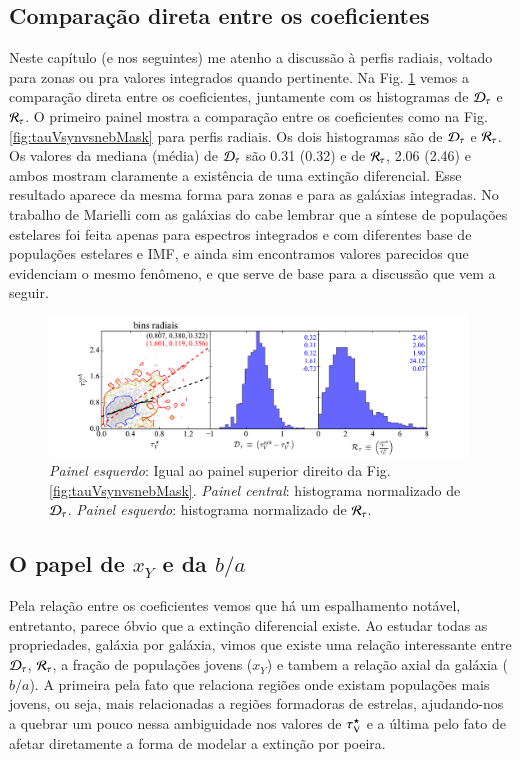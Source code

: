 \subsection{Comparação direta entre os coeficientes}
\label{sec:difextin:emp:comparetauV}

Neste capítulo (e nos seguintes) me atenho a discussão à perfis radiais, voltado para zonas ou pra
valores integrados quando pertinente. Na Fig. \ref{fig:tauVhisto} vemos a comparação direta entre os
coeficientes, juntamente com os histogramas de $\Dtau$ e $\Rtau$. O primeiro painel mostra a
comparação entre os coeficientes como na Fig. \ref{fig:tauVsynvsnebMask} para perfis radiais. Os dois
histogramas são de $\Dtau$ e $\Rtau$. Os valores da mediana (média) de $\Dtau$ são 0.31 (0.32) e de
$\Rtau$, 2.06 (2.46) e ambos mostram claramente a existência de uma extinção diferencial. Esse
resultado aparece da mesma forma para zonas e para as galáxias integradas. No trabalho de Marielli
com as galáxias do \SDSS cabe lembrar que a síntese de populações estelares foi feita apenas para
espectros integrados e com diferentes base de populações estelares e IMF, e ainda sim encontramos
valores parecidos que evidenciam o mesmo fenômeno, e que serve de base para a discussão que vem a
seguir.

\begin{figure}
	\centering
	\includegraphics[width=0.99\textwidth]{figuras/histoTauVR.pdf}
	\caption[Comparação $\tauVS$ e histogramas de $\Dtau$ e $\Rtau$.]
	{\emph{Painel esquerdo}: Igual ao painel superior direito da Fig. \ref{fig:tauVsynvsnebMask}.
\emph{Painel central}: histograma normalizado de $\Dtau$. \emph{Painel esquerdo}: histograma
normalizado de $\Rtau$.}
	\label{fig:tauVhisto}
\end{figure}

\subsection{O papel de $x_Y$ e da $b/a$}
\label{sec:difextin:emp:xYcosi}

Pela relação entre os coeficientes vemos que há um espalhamento notável, entretanto, parece óbvio
que a extinção diferencial existe. Ao estudar todas as propriedades, galáxia por galáxia, vimos que
existe uma relação interessante entre $\Dtau$, $\Rtau$, a fração de populações jovens ($x_Y$) e
tambem a relação axial da galáxia ($b/a$). A primeira pela fato que relaciona regiões onde existam
populações mais jovens, ou seja, mais relacionadas a regiões formadoras de estrelas, ajudando-nos a quebrar um
pouco nessa ambiguidade nos valores de $\tauVS$ e a última pelo fato de afetar diretamente a forma
de modelar a extinção por poeira.

